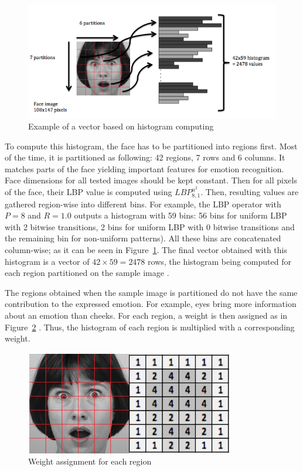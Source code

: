 \begin{figure}[!h]
\begin{center}
\noindent \includegraphics[scale=0.7]{figures/lbp_histogram} 
\newline
\caption{Example of a vector based on histogram computing}
\label{lbp_histogram}
\end{center} 
\end{figure}


\noindent To compute this histogram, the face has to be partitioned into regions first. Most of the time, it is partitioned as following: 42 regions, 7 rows and 6 columns. It matches parts of the face yielding important features for emotion recognition. Face dimensions for all tested images should be kept constant. Then for all pixels of the face, their LBP value is computed using $ LBP_{8,1}^{u^2} $. Then, resulting values are gathered region-wise into different bins. For example, the LBP operator with $ P = 8 $ and $ R = 1.0 $ outputs a histogram with 59 bins: 56 bins for uniform LBP with 2 bitwise transitions, 2 bins for uniform LBP with 0 bitwise transitions and the remaining bin for non-uniform patterns). All these bins are concatenated column-wise; as it can be seen in Figure~\ref{lbp_histogram}. The final vector obtained with this histogram is a vector of $ 42\times59 = 2478 $ rows, the histogram being computed for each region partitioned on the sample image \cite{GAN08}.
\newline

\noindent The regions obtained when the sample image is partitioned do not have the same contribution to the expressed emotion. For example, eyes bring more information about an emotion than cheeks. For each region, a weight is then assigned as in Figure~\ref{lbp_region_weight} \cite{GAN08}. Thus, the histogram of each region is multiplied with a corresponding weight.
\newline

\begin{figure}[!h]
\begin{center}
\noindent \includegraphics[scale=0.6]{figures/lbp_region_weight} 
\newline
\caption{Weight assignment for each region}
\label{lbp_region_weight}
\end{center} 
\end{figure}
